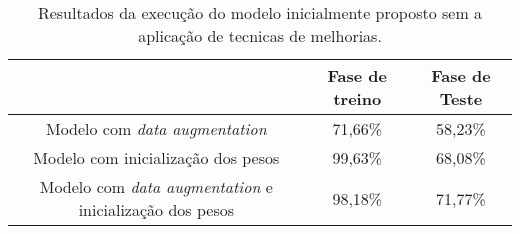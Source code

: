 \begin{table}[H]
    \centering
    \caption{Resultados da execução do modelo inicialmente proposto sem a aplicação de tecnicas de melhorias.
    \label{tab:resultado2}}
    \begin{tabular}{ccc}
        \toprule
              & Fase de treino & Fase de Teste \\
        \midrule
            Modelo com \textit{data augmentation} & 71,66\% & 58,23\%  \\
            Modelo com inicialização dos pesos & 99,63\% & 68,08\%  \\
            Modelo com \textit{data augmentation} e inicialização dos pesos & 98,18\% & 71,77\%  \\
        \bottomrule
    \end{tabular}
\end{table}
